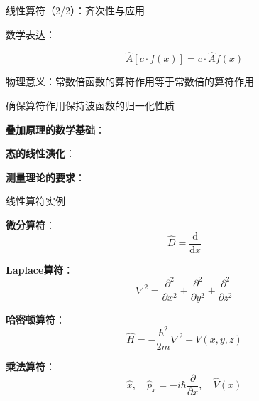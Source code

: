 \documentclass[aspectratio=169, 10pt]{beamer}
\begin{document}
\begin{frame}{线性算符（2/2）：齐次性与应用}

  
  \begin{iqbitemize}
    \item 数学表达：
    \end{iqbitemize}
      \[
        \hat{A}[c \cdot f(x)] = c \cdot \hat{A}f(x)
      \]
    \begin{iqbitemize}
    \item 物理意义：常数倍函数的算符作用等于常数倍的算符作用
    \item 确保算符作用保持波函数的归一化性质
    \end{iqbitemize}

    \begin{iqbitemize}
    \item \textbf{叠加原理的数学基础}：

    \item \textbf{态的线性演化}：

    \item \textbf{测量理论的要求}：
    \end{iqbitemize}

\end{frame}

\begin{frame}{线性算符实例}


  \begin{iqbitemize}
  \item \textbf{微分算符}：
  \[
    \hat{D} = \dfrac{\mathrm{d}}{\mathrm{d}x}
  \]

  \item \textbf{Laplace算符}：
  \[
    \nabla^2 = \dfrac{\partial^2}{\partial x^2} + \dfrac{\partial^2}{\partial y^2} + \dfrac{\partial^2}{\partial z^2}
  \]

  \item \textbf{哈密顿算符}：
  \[
    \hat{H} = -\dfrac{\hbar^2}{2m}\nabla^2 + V(x,y,z)
  \]

  \item \textbf{乘法算符}：
  \[
    \hat{x}, \quad \hat{p}_x = -i\hbar\dfrac{\partial}{\partial x}, \quad \hat{V}(x)
  \]
  \end{iqbitemize}

  \iqbsep

\end{frame}
\end{document}

